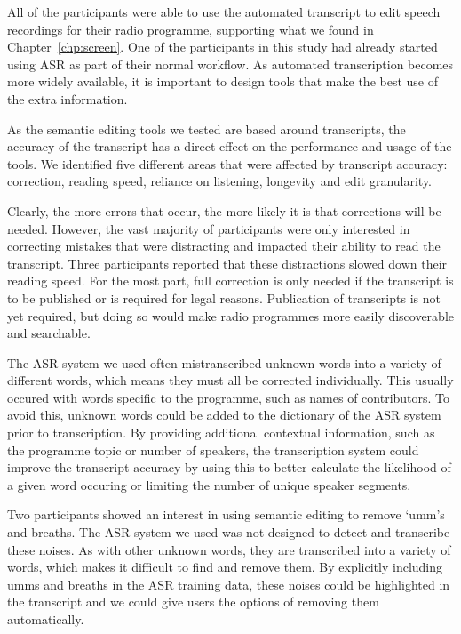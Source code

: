 All of the participants were able to use the automated transcript to edit speech recordings for their radio programme,
supporting what we found in Chapter~\ref{chp:screen}. One of the participants in this study had already started using
ASR as part of their normal workflow. As automated transcription becomes more widely available, it is
important to design tools that make the best use of the extra information.

As the semantic editing tools we tested are based around transcripts, the accuracy of the transcript has a direct
effect on the performance and usage of the tools. We identified five different areas that were affected by transcript
accuracy: correction, reading speed, reliance on listening, longevity and edit granularity.

Clearly, the more errors that occur, the more likely it is that corrections will be needed. However, the vast majority
of participants were only interested in correcting mistakes that were distracting and impacted their ability to read
the transcript. Three participants reported that these distractions slowed down their reading speed.  For the most
part, full correction is only needed if the transcript is to be published or is required for legal reasons. Publication
of transcripts is not yet required, but doing so would make radio programmes more easily discoverable and searchable.


The ASR system we used often mistranscribed unknown words into a variety of different words, which means
they must all be corrected individually. This usually occured with words specific to the programme, such as names of
contributors. To avoid this, unknown words could be added to the dictionary of the ASR system prior to
transcription. By providing additional contextual information, such as the programme topic or number of speakers, the
transcription system could improve the transcript accuracy by using this to better calculate the likelihood of a given
word occuring or limiting the number of unique speaker segments.

Two participants showed an interest in using semantic editing to remove `umm's and breaths. The ASR system
we used was not designed to detect and transcribe these noises. As with other unknown words, they are transcribed into
a variety of words, which makes it difficult to find and remove them. By explicitly including umms and breaths in the
ASR training data, these noises could be highlighted in the transcript and we could give users the options
of removing them automatically.

